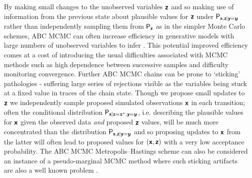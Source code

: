 By making small changes to the unobserved variables $\boldsymbol{\mathsf{z}}$ and so making use of information from the previous state about plausible values for $\boldsymbol{\mathsf{z}}$ under $\mathsf{P}_{\boldsymbol{\mathsf{x}},\boldsymbol{\mathsf{z}}|\boldsymbol{\mathsf{y}}=\boldsymbol{y}}$ rather than independently sampling them from $\mathsf{P}_{\boldsymbol{\mathsf{z}}}$ as in the simpler Monte Carlo schemes, \ac{ABC} \ac{MCMC} can often increase efficiency in generative models with large numbers of unobserved variables to infer \cite{sisson2011likelihood}. This potential improved efficiency comes at a cost of introducing the usual difficulties associated with \ac{MCMC} methods such as high dependence between successive samples and difficulty monitoring convergence. Further \ac{ABC} \ac{MCMC} chains can be prone to `sticking' pathologies - suffering large series of rejections visible as the variables being stuck at a fixed value in traces of the chain state. Though we propose small updates to $\boldsymbol{\mathsf{z}}$ we independently sample proposed simulated observations $\boldsymbol{\mathsf{x}}$ in each transition; often the conditional distribution $\mathsf{P}_{\boldsymbol{\mathsf{x}}|\boldsymbol{\mathsf{z}}=\boldsymbol{z}^*,\boldsymbol{\mathsf{y}}=\boldsymbol{y}}$, i.e. describing the plausible values for $\boldsymbol{\mathsf{x}}$ given the observed data \emph{and} proposed $\boldsymbol{\mathsf{z}}$ values, will be much more concentrated than the distribution $\mathsf{P}_{\boldsymbol{\mathsf{x}},\boldsymbol{\mathsf{z}}|\boldsymbol{\mathsf{y}}=\boldsymbol{y}}$ and so proposing updates to $\boldsymbol{\mathsf{x}}$ from the latter will often lead to proposed values for $(\boldsymbol{\mathsf{x}},\boldsymbol{\mathsf{z}})$ with a very low acceptance probability.
The \ac{ABC MCMC} Metropolis--Hastings scheme can also be considered an instance of a pseudo-marginal \ac{MCMC} method \citep{beaumont2002approximate,andrieu2009pseudo} where such sticking artifacts are also a well known problem \citep{murray2010slice}. %



